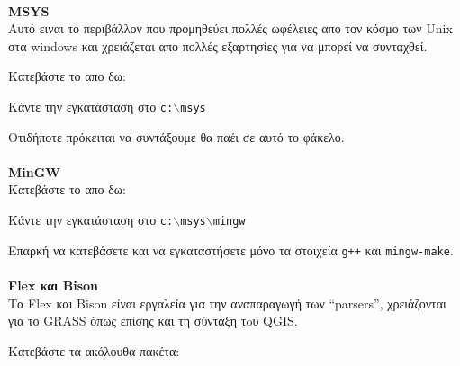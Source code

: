 \paragraph{}\textbf{MSYS}\\

Αυτό ειναι το περιβάλλον που προμηθεύει πολλές ωφέλειες απο τον κόσμο των Unix στα windows και χρειάζεται απο πολλές εξαρτησίες για να μπορεί να συνταχθεί.

Κατεβάστε το απο δω:

	\begin{quotation}
	\end{quotation}

Κάντε την εγκατάσταση στο \texttt{c:$\backslash$msys}

Οτιδήποτε πρόκειται να συντάξουμε θα παέι σε αυτό το φάκελο.

\paragraph{}\textbf{MinGW}\\

Κατεβάστε το απο δω:

	\begin{quotation}
	\end{quotation}

Κάντε την εγκατάσταση στο \texttt{c:$\backslash$msys$\backslash$mingw}

Επαρκή να κατεβάσετε και να εγκαταστήσετε μόνο τα στοιχεία \texttt{g++} και \texttt{mingw-make}. 

\paragraph{}\textbf{Flex και Bison}\\

Τα Flex και Bison είναι εργαλεία για την αναπαραγωγή των “parsers”, χρειάζονται για το GRASS όπως επίσης και τη σύνταξη τoυ QGIS.

Κατεβάστε τα ακόλουθα πακέτα:

	\begin{quotation}
	\end{quotation}

